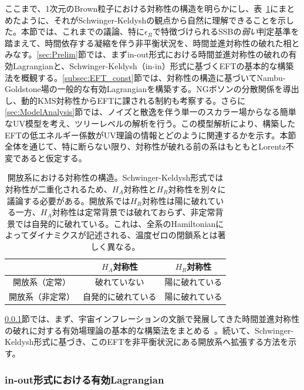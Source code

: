 \label{section:ConstructingEFT}

ここまで、1次元のBrown粒子における対称性の構造を明らかにし、表~\ref{table:ss}にまとめたように、それがSchwinger-Keldyshの観点から自然に理解できることを示した。本節では、これまでの議論、特に$\epsilon_R$で特徴づけられるSSBの\textit{弱い}判定基準を踏まえて、時間依存する凝縮を伴う非平衡状況を、時間並進対称性の破れた相とみなす。\ref{sec:Prelim}節では、まずin-out形式における時間並進対称性の破れの有効Lagrangianと、Schwinger-Keldysh（in-in）形式に基づくEFTの基本的な構築法を概観する。\ref{subsec:EFT_const}節では、対称性の構造に基づいてNambu-Goldstone場の一般的な有効Lagrangianを構築する。NGボソンの分散関係を導出し、動的KMS対称性からEFTに課される制約も考察する。さらに\ref{sec:ModelAnalysis}節では、ノイズと散逸を伴う単一のスカラー場からなる簡単なUV模型を考え、ツリーレベルの解析を行う。この模型解析により、構築したEFTの低エネルギー係数がUV理論の情報とどのように関連するかを示す。本節全体を通じて、特に断らない限り、対称性が破れる前の系はもともとLorentz不変であると仮定する。

\begin{table}[t]
  \centering
  \begin{tabular}{c|cc}
    \hline
    &$H_{A}$対称性&$H_{R}$対称性\\
    \hline \hline
   開放系（定常） & 破れていない & 陽に破れている \\
   開放系（非定常） & 自発的に破れている & 陽に破れている \\
    \hline
  \end{tabular}
 \caption{開放系における対称性の構造。Schwinger-Keldysh形式では対称性が二重化されるため、$H_A$対称性と$H_R$対称性を別々に議論する必要がある。開放系では$H_R$対称性は陽に破れている一方、$H_A$対称性は定常背景では破れておらず、非定常背景では自発的に破れている。これは、全系のHamiltonianによってダイナミクスが記述される、温度ゼロの閉鎖系とは著しく異なる。}
 \label{table:ss}
\end{table}

\label{sec:Prelim}
\ref{subsec:EFT_in-out}節では、まず、宇宙インフレーションの文脈で発展してきた時間並進対称性の破れに対する有効場理論の基本的な構築法をまとめる~\cite{Cheung:2007st}。続いて、Schwinger-Keldysh形式に基づき、このEFTを非平衡状況にある開放系へ拡張する方法を示す。

\subsubsection{in-out形式における有効Lagrangian}
\label{subsec:EFT_in-out}

